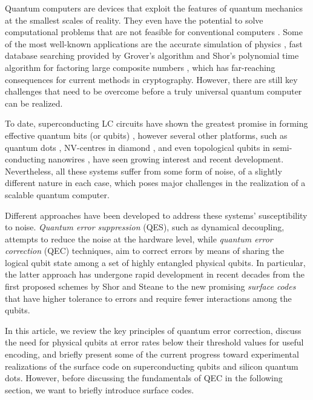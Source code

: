 Quantum computers are devices that exploit the features of quantum mechanics at
the smallest scales of reality. They even have the potential to solve
computational problems that are not feasible for conventional computers
\cite{nielsen_chuang_2010}. Some of the most well-known applications are the
accurate simulation of physics \cite{feynman82_simul_physic_with_comput}, fast
database searching provided by Grover's algorithm \cite{Grover_1996} and Shor's
polynomial time algorithm for factoring large composite numbers
\cite{Shor_1997}, which has far-reaching consequences for current methods in
cryptography. However, there are still key challenges that need to
be overcome before a truly universal quantum computer can be realized.

To date, superconducting LC circuits have shown the greatest promise in forming
effective quantum bits (or qubits) \cite{Rol_2019}
\cite{barends14_super_quant_circuit_at_surfac}, however several other platforms,
such as quantum dots \cite{huang19_fidel_bench_two_qubit_gates_silic}
\cite{Lawrie_2020}, NV-centres in diamond \cite{Taminiau_2014}, and even
topological qubits in semi-conducting nanowires \cite{Mourik_2012}, have seen
growing interest and recent development. Nevertheless, all these systems suffer
from some form of noise, of a slightly different nature in each case, which
poses major challenges in the realization of a scalable quantum computer.

Different approaches have been developed to address these systems'
susceptibility to noise. \textit{Quantum error suppression} (QES), such as
dynamical decoupling, attempts to reduce the noise at the hardware level, while
\textit{quantum error correction} (QEC) techniques, aim to correct errors by
means of sharing the logical qubit state among a set of highly entangled
physical qubits. In particular, the latter approach has undergone rapid
development in recent decades from the first proposed schemes by Shor
\cite{Shor_1995_QEC} and Steane \cite{Steane_1996_QEC} to the new promising
\textit{surface codes} \cite{fowler12_surfac_codes} that have higher tolerance
to errors and require fewer interactions among the qubits.

In this article, we review the key principles of quantum error correction,
discuss the need for physical qubits at error rates below their threshold values
for useful encoding, and briefly present some of the current progress toward
experimental realizations of the surface code on superconducting qubits and
silicon quantum dots. However, before discussing the fundamentals of QEC in the
following section, we want to briefly introduce surface codes.

